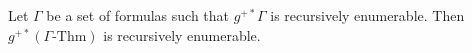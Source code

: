 Let $\Gamma$ be a set of formulas such that $g^{+*} \Gamma$ is recursively enumerable. Then $g^{+*}(\Gamma\text{-Thm})$ is recursively enumerable.
